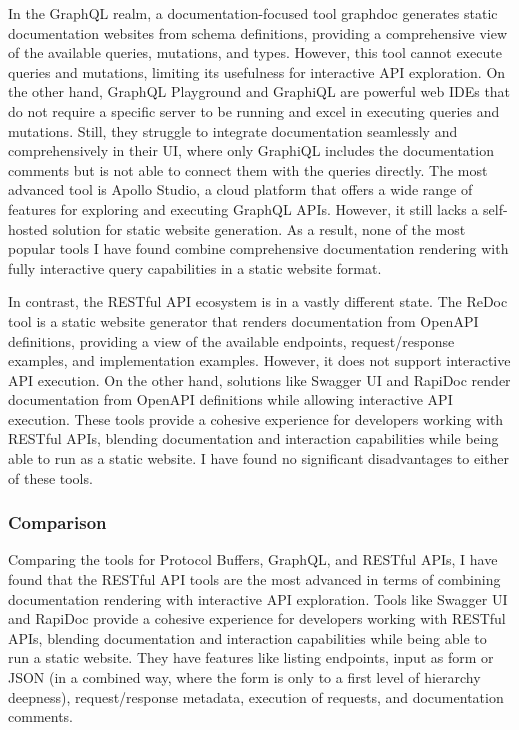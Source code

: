In the GraphQL realm, a documentation-focused tool graphdoc generates static documentation websites from schema definitions, providing a comprehensive view of the available queries, mutations, and types.
However, this tool cannot execute queries and mutations, limiting its usefulness for interactive API exploration.
On the other hand, GraphQL Playground and GraphiQL are powerful web IDEs that do not require a specific server to be running and excel in executing queries and mutations.
Still, they struggle to integrate documentation seamlessly and comprehensively in their UI, where only GraphiQL includes the documentation comments but is not able to connect them with the queries directly.
The most advanced tool is Apollo Studio, a cloud platform that offers a wide range of features for exploring and executing GraphQL APIs.
However, it still lacks a self-hosted solution for static website generation.
As a result, none of the most popular tools I have found combine comprehensive documentation rendering with fully interactive query capabilities in a static website format.

In contrast, the RESTful API ecosystem is in a vastly different state.
The ReDoc tool is a static website generator that renders documentation from OpenAPI definitions, providing a view of the available endpoints, request/response examples, and implementation examples.
However, it does not support interactive API execution.
On the other hand, solutions like Swagger UI and RapiDoc render documentation from OpenAPI definitions while allowing interactive API execution.
These tools provide a cohesive experience for developers working with RESTful APIs, blending documentation and interaction capabilities while being able to run as a static website.
I have found no significant disadvantages to either of these tools.

\subsubsection{Comparison}
Comparing the tools for Protocol Buffers, GraphQL, and RESTful APIs, I have found that the RESTful API tools are the most advanced in terms of combining documentation rendering with interactive API exploration.
Tools like Swagger UI and RapiDoc provide a cohesive experience for developers working with RESTful APIs, blending documentation and interaction capabilities while being able to run a static website.
They have features like listing endpoints, input as form or JSON (in a combined way, where the form is only to a first level of hierarchy deepness), request/response metadata, execution of requests, and documentation comments.

